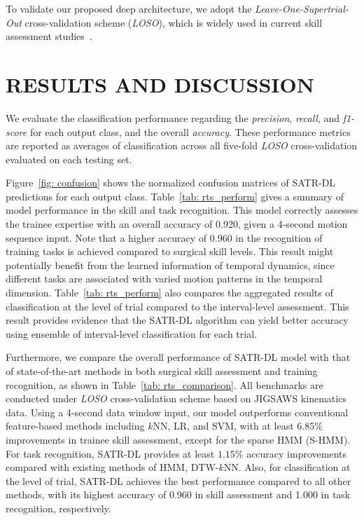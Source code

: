 \documentclass[letterpaper, 10 pt, conference, twoside]{IEEEtran}
\begin{document}
To validate our proposed deep architecture, we adopt the \textit{Leave-One-Supertrial-Out} cross-validation scheme (\textit{LOSO}), which is widely used in current skill assessment studies~\cite{gao2014JIGSAW}. 

\section{RESULTS AND DISCUSSION}
We evaluate the classification performance regarding the \textit{precision}, \textit{recall}, and \textit{f1-score} for each output class, and the overall \textit{accuracy}. These performance metrics are reported as averages of classification across all five-fold \textit{LOSO} cross-validation evaluated on each testing set. 

Figure~\ref{fig: confusion} shows the normalized confusion matrices of SATR-DL predictions for each output class. Table~\ref{tab: rts_perform} gives a summary of model performance in the skill and task recognition. 
This model correctly assesses the trainee expertise with an overall accuracy of 0.920, given a 4-second motion sequence input. 
Note that a higher accuracy of 0.960 in the recognition of training tasks is achieved compared to surgical skill levels. This result might potentially benefit from the learned information of temporal dynamics, since different tasks are associated with varied motion patterns in the temporal dimension.
Table~\ref{tab: rts_perform} also compares the aggregated results of classification at the level of trial compared to the interval-level assessment. This result provides evidence that the SATR-DL algorithm can yield better accuracy using ensemble of interval-level classification for each trial.  

Furthermore, we compare the overall performance of SATR-DL model with that of state-of-the-art methods in both surgical skill assessment and training recognition, as shown in Table~\ref{tab: rts_comparison}. All benchmarks are conducted under \textit{LOSO} cross-validation scheme based on JIGSAWS kinematics data. Using a 4-second data window input, our model outperforms conventional feature-based methods including $k$NN, LR, and SVM, with at least $6.85\%$ improvements in trainee skill assessment, except for the sparse HMM (S-HMM). For task recognition, SATR-DL provides at least $1.15\%$ accuracy improvements compared with existing methods of HMM, DTW-$k$NN. Also, for classification at the level of trial, SATR-DL achieves the best performance compared to all other methods, with its highest accuracy of 0.960 in skill assessment and 1.000 in task recognition, respectively. 
\end{document}
